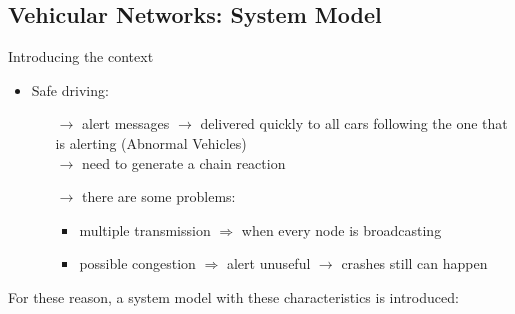 \subsection{Vehicular Networks: System Model}
Introducing the context
\begin{itemize}
    \item Safe driving:
    \begin{itemize}
        \item[$\rightarrow$] alert messages $\rightarrow$ delivered quickly to all
        cars following the one that is alerting (Abnormal Vehicles)\\
        $\rightarrow$ need to generate a chain reaction
        \item[$\rightarrow$] there are some problems:
        \begin{itemize}
            \item multiple transmission $\Rightarrow$ when every node is broadcasting
            \item possible congestion $\Rightarrow$ alert unuseful $\rightarrow$ crashes
            still can happen
        \end{itemize}
    \end{itemize}
\end{itemize}
For these reason, a system model with these characteristics is introduced:
